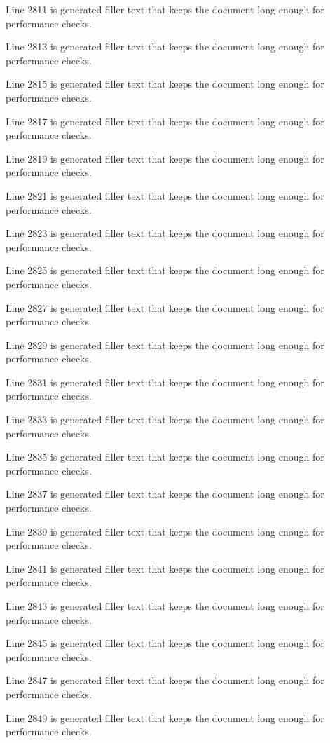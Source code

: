 Line 2811 is generated filler text that keeps the document long enough for performance checks.

Line 2813 is generated filler text that keeps the document long enough for performance checks.

Line 2815 is generated filler text that keeps the document long enough for performance checks.

Line 2817 is generated filler text that keeps the document long enough for performance checks.

Line 2819 is generated filler text that keeps the document long enough for performance checks.

Line 2821 is generated filler text that keeps the document long enough for performance checks.

Line 2823 is generated filler text that keeps the document long enough for performance checks.

Line 2825 is generated filler text that keeps the document long enough for performance checks.

Line 2827 is generated filler text that keeps the document long enough for performance checks.

Line 2829 is generated filler text that keeps the document long enough for performance checks.

Line 2831 is generated filler text that keeps the document long enough for performance checks.

Line 2833 is generated filler text that keeps the document long enough for performance checks.

Line 2835 is generated filler text that keeps the document long enough for performance checks.

Line 2837 is generated filler text that keeps the document long enough for performance checks.

Line 2839 is generated filler text that keeps the document long enough for performance checks.

Line 2841 is generated filler text that keeps the document long enough for performance checks.

Line 2843 is generated filler text that keeps the document long enough for performance checks.

Line 2845 is generated filler text that keeps the document long enough for performance checks.

Line 2847 is generated filler text that keeps the document long enough for performance checks.

Line 2849 is generated filler text that keeps the document long enough for performance checks.

